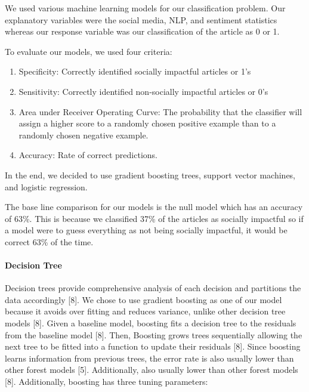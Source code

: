 \documentclass[10pt,letterpaper]{article}
\providecommand{\tightlist}{%
  \setlength{\itemsep}{0pt}\setlength{\parskip}{0pt}}
\begin{document}
We used various machine learning models for our classification problem.
Our explanatory variables were the social media, NLP, and sentiment
statistics whereas our response variable was our classification of the
article as 0 or 1.

To evaluate our models, we used four criteria:

\begin{enumerate}
\def\labelenumi{\arabic{enumi}.}
\tightlist
\item
  Specificity: Correctly identified socially impactful articles or 1's
\item
  Sensitivity: Correctly identified non-socially impactful articles or
  0's
\item
  Area under Receiver Operating Curve: The probability that the
  classifier will assign a higher score to a randomly chosen positive
  example than to a randomly chosen negative example.
\item
  Accuracy: Rate of correct predictions.
\end{enumerate}

In the end, we decided to use gradient boosting trees, support vector
machines, and logistic regression.

The base line comparison for our models is the null model which has an
accuracy of 63\%. This is because we classified 37\% of the articles as
socially impactful so if a model were to guess everything as not being
socially impactful, it would be correct 63\% of the time.

\paragraph{Decision Tree}\label{decision-tree}

Decision trees provide comprehensive analysis of each decision and
partitions the data accordingly {[}8{]}. We chose to use gradient
boosting as one of our model because it avoids over fitting and reduces
variance, unlike other decision tree models {[}8{]}. Given a baseline
model, boosting fits a decision tree to the residuals from the baseline
model {[}8{]}. Then, Boosting grows trees sequentially allowing the next
tree to be fitted into a function to update their residuals {[}8{]}.
Since boosting learns information from previous trees, the error rate is
also usually lower than other forest models {[}5{]}. Additionally,
also usually lower than other forest models {[}8{]}. Additionally,
boosting has three tuning parameters:
\end{document}
